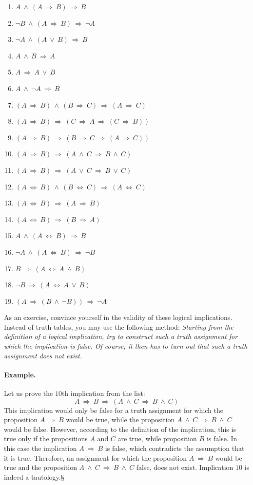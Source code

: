 \documentclass[11pt,paper=b5,footinclude,headinclude]{scrbook} %
\def\ali {{~\vee~}}
\def\inn {{~\wedge~}}
\def\sledi {{~\Rightarrow~}}
\def\cee {{~\Leftrightarrow~}}
\def\kz{{\hfill{\S}}}%
\theoremstyle{remark}
\theoremstyle{definition} %
\theoremstyle{theorem} %
\begin{document}
\begin{enumerate}
	\item $A \inn (A \sledi B) \sledi B$
	\item $\neg B \inn (A \sledi B) \sledi \neg A$
	\item $\neg A \inn (A \ali B) \sledi B$
	\item $A \inn B \sledi A$
	\item $A \sledi A\ali B$
	\item $A \inn \neg A\sledi B$
	\item $(A \sledi B) \inn (B \sledi C) \sledi (A\sledi C)$
	\item $(A \sledi B) \sledi (C \sledi A \sledi (C\sledi B))$
	\item $(A \sledi B) \sledi (B \sledi C \sledi (A\sledi C))$
	\item $(A \sledi B) \sledi (A\inn C \sledi B\inn C)$
	\item $(A \sledi B) \sledi (A\ali C \sledi B\ali C)$
	\item $(A \cee B) \inn (B\cee C) \sledi (A\cee C)$
	\item $(A \cee B) \sledi (A\sledi B)$
	\item $(A \cee B) \sledi (B\sledi A)$
	\item $A \inn (A \cee B) \sledi B$
	\item $\neg A \inn (A \cee B) \sledi \neg B$
	\item $B\sledi (A\cee A \inn B)$
	\item $\neg B\sledi (A\cee A \ali B)$
	\item $(A\sledi (B\inn \neg B)) \sledi \neg A$
\end{enumerate}

As an exercise, convince yourself in the validity of these logical implications.
Instead of truth tables, you may use the following method: {\em Starting from the definition of a logical implication, try to construct such a truth assignment for which the implication is false. Of course, it then has to turn out that such a truth assignment does not exist.}

\bigskip
\paragraph{Example.}
Let us prove the $10$th implication from the list:
$$A \sledi B \sledi (A\inn C \sledi B\inn C)$$
This implication would only be false for a truth assignment for which the proposition
$A \sledi B$ would be true, while the proposition $A\inn C \sledi B\inn C$ would be false.
However, according to the definition of the implication, this is true only if the propositions
$A$ and $C$ are true, while proposition $B$ is false.
In this case the implication $A \sledi B$ is false, which contradicts the assumption that it is true.
Therefore, an assignment for which the proposition $A \sledi B$ would be true and the proposition $A\inn C \sledi B\inn C$ false, does not exist.
Implication $10$ is indeed a tautology.\kz
\medskip
\end{document}
